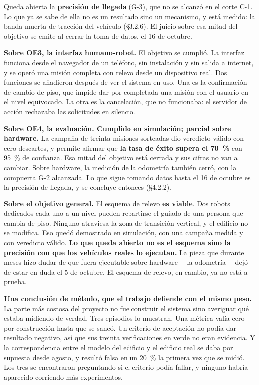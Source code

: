 Queda abierta la \textbf{precisión de llegada} (G-3), que no se alcanzó en el
corte C-1. Lo que ya se sabe de ella no es un resultado sino un mecanismo, y está
medido: la banda muerta de tracción del vehículo (§3.2.6). El juicio sobre esa
mitad del objetivo se emite al cerrar la toma de datos, el 16 de octubre.

\textbf{Sobre OE3, la interfaz humano-robot.} El objetivo se cumplió. La interfaz
funciona desde el navegador de un teléfono, sin instalación y sin salida a
internet, y se operó una misión completa con relevo desde un dispositivo real. Dos
funciones se añadieron después de ver el sistema en uso. Una es la confirmación
de cambio de piso, que impide dar por completada una misión con el usuario en el
nivel equivocado. La otra es la cancelación, que no funcionaba: el servidor de
acción rechazaba las solicitudes en silencio.

\textbf{Sobre OE4, la evaluación. Cumplido en simulación; parcial sobre
hardware.} La campaña de treinta misiones sorteadas dio veredicto válido con cero
descartes, y permite afirmar que \textbf{la tasa de éxito supera el 70~\%} con
95~\% de confianza. Esa mitad del objetivo está cerrada y sus cifras no van a
cambiar. Sobre hardware, la medición de la odometría también cerró, con la
compuerta G-2 alcanzada. Lo que sigue tomando datos hasta el 16 de octubre es la
precisión de llegada, y se concluye entonces (§4.2.2).

\textbf{Sobre el objetivo general.} El esquema de relevo \textbf{es viable}. Dos
robots dedicados cada uno a un nivel pueden repartirse el guiado de una persona
que cambia de piso. Ninguno atraviesa la zona de transición vertical, y el
edificio no se modifica. Eso quedó demostrado en simulación, con una campaña
medida y con veredicto válido. \textbf{Lo que queda abierto no es el esquema sino
la precisión con que los vehículos reales lo ejecutan.} La pieza que durante
meses hizo dudar de que fuera ejecutable sobre hardware —la odometría— dejó de
estar en duda el 5 de octubre. El esquema de relevo, en cambio, ya no está a
prueba.

\textbf{Una conclusión de método, que el trabajo defiende con el mismo peso.} La
parte más costosa del proyecto no fue construir el sistema sino averiguar qué
estaba midiendo de verdad. Tres episodios lo muestran. Una métrica valía cero por
construcción hasta que se saneó. Un criterio de aceptación no podía dar resultado
negativo, así que sus treinta verificaciones en verde no eran evidencia. Y la
correspondencia entre el modelo del edificio y el edificio real se daba por
supuesta desde agosto, y resultó falsa en un 20~\% la primera vez que se midió. Los tres se encontraron preguntando si el criterio podía fallar, y ninguno
habría aparecido corriendo más experimentos.
